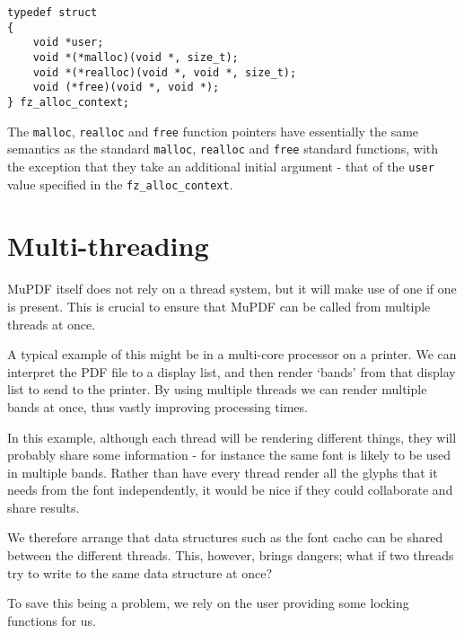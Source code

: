 \documentclass[oneside]{book}
\begin{document}
\begin{lstlisting}
typedef struct
{
	void *user;
	void *(*malloc)(void *, size_t);
	void *(*realloc)(void *, void *, size_t);
	void (*free)(void *, void *);
} fz_alloc_context;
\end{lstlisting}

The \texttt{malloc}, \texttt{realloc} and \texttt{free} function pointers have essentially the same semantics as the standard \texttt{malloc}, \texttt{realloc} and \texttt{free} standard functions, with the exception that they take an additional initial argument - that of the \texttt{user} value specified in the  \texttt{fz\_alloc\_context}.


\section{Multi-threading}
\label{MultiThreading}

MuPDF itself does not rely on a thread system, but it will make use of one if one is present. This is crucial to ensure that MuPDF can be called from multiple threads at once.

A typical example of this might be in a multi-core processor on a printer. We can  interpret the PDF file to a display list, and then render `bands' from that display list to send to the printer. By using multiple threads we can render multiple bands at once, thus vastly improving processing times.

In this example, although each thread will be rendering different things, they will probably share some information - for instance the same font is likely to be used in multiple bands. Rather than have every thread render all the glyphs that it needs from the font independently, it would be nice if they could collaborate and share results.

We therefore arrange that data structures such as the font cache can be shared between the different threads. This, however, brings dangers; what if two threads try to write to the same data structure at once?

To save this being a problem, we rely on the user providing some locking functions for us.
\end{document}
